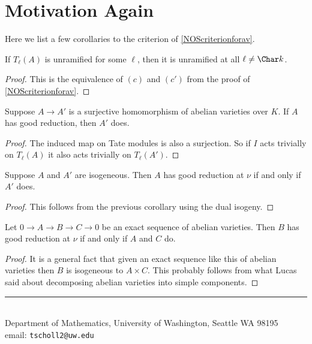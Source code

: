 \documentclass[11pt]{article}
\makeatletter
\newcommand{\myauthor}{Travis Scholl}
\newcommand{\myemail}{tscholl2@uw.edu}
\makeatother
\begin{document}
\section{Motivation Again}

Here we list a few corollaries to the criterion of \autoref{NOScriterionforav}.
\begin{cor}
	If $T_\ell(A)$ is unramified for some $\ell$, then it is unramified at all $\ell\neq\Char k$.
\end{cor}
\begin{proof}
	This is the equivalence of $(c)$ and $(c')$ from the proof of \autoref{NOScriterionforav}.
\end{proof}

\begin{cor}
	Suppose $A \to A'$ is a surjective homomorphism of abelian varieties over $K$. If $A$ has good reduction, then $A'$ does.
\end{cor}
\begin{proof}
	The induced map on Tate modules is also a surjection. So if $I$ acts trivially on $T_\ell(A)$ it also acts trivially on $T_\ell(A')$.
\end{proof}

\begin{cor}
	Suppose $A$ and $A'$ are isogeneous. Then $A$ has good reduction at $\nu$ if and only if $A'$ does.
\end{cor}
\begin{proof}
	This follows from the previous corollary using the dual isogeny.
\end{proof}

\begin{cor}
	Let $0 \to A \to B \to C \to 0$ be an exact sequence of abelian varieties. Then $B$ has good reduction at $\nu$ if and only if $A$ and $C$ do.
\end{cor}
\begin{proof}
	It is a general fact that given an exact sequence like this of abelian varieties then $B$ is isogeneous to $A\times C$. This probably follows from what Lucas said about decomposing abelian varieties into simple components.
\end{proof}




\begin{center}
\noindent\rule{4cm}{.5pt}
\vspace{.25cm}

\noindent {\sc \small \myauthor}\\
{\small Department of Mathematics, University of Washington, Seattle WA 98195} \\
email: {\tt \myemail}
\end{center}
\end{document}
